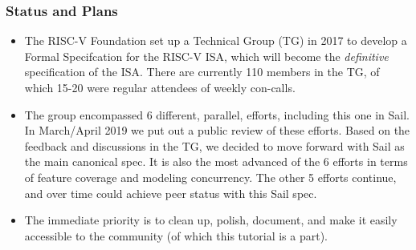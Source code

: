 \documentclass[aspectratio=169]{beamer}
\newcommand{\slidefont}{\scriptsize}
\begin{document}
\begin{frame}[fragile]
  \frametitle{Status and Plans}

  \slidefont

  \begin{itemize}
  \item
    The RISC-V Foundation set up a Technical Group (TG) in 2017 to
    develop a Formal Specifcation for the RISC-V ISA, which will
    become the \emph{definitive} specification of the ISA.  There are
    currently 110 members in the TG, of which 15-20 were regular
    attendees of weekly con-calls.

  \item 
    The group encompassed 6 different, parallel, efforts, including
    this one in Sail.  In March/April 2019 we put out a public review
    of these efforts.  Based on the feedback and discussions in the
    TG, we decided to move forward with Sail as the main canonical
    spec. It is also the most advanced of the 6 efforts in terms of
    feature coverage and modeling concurrency.  The other 5 efforts
    continue, and over time could achieve peer status with this Sail
    spec.

  \item
    The immediate priority is to clean up, polish, document, and make
    it easily accessible to the community (of which this tutorial is a
    part).

  \end{itemize}

\end{frame}

\end{document}
